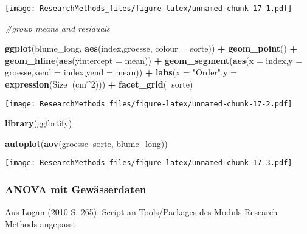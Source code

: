 \documentclass[]{book}
\newenvironment{Shaded}{\begin{snugshade}}{\end{snugshade}}
\newcommand{\KeywordTok}[1]{\textcolor[rgb]{0.13,0.29,0.53}{\textbf{#1}}}
\newcommand{\DataTypeTok}[1]{\textcolor[rgb]{0.13,0.29,0.53}{#1}}
\newcommand{\DecValTok}[1]{\textcolor[rgb]{0.00,0.00,0.81}{#1}}
\newcommand{\StringTok}[1]{\textcolor[rgb]{0.31,0.60,0.02}{#1}}
\newcommand{\CommentTok}[1]{\textcolor[rgb]{0.56,0.35,0.01}{\textit{#1}}}
\newcommand{\OperatorTok}[1]{\textcolor[rgb]{0.81,0.36,0.00}{\textbf{#1}}}
\newcommand{\NormalTok}[1]{#1}
\begin{document}
\texttt{[image: ResearchMethods\_files/figure-latex/unnamed-chunk-17-1.pdf]}

\begin{Shaded}
\begin{Highlighting}[]

\CommentTok{#group means and residuals}

\KeywordTok{ggplot}\NormalTok{(blume_long, }\KeywordTok{aes}\NormalTok{(index,groesse, }\DataTypeTok{colour =}\NormalTok{ sorte)) }\OperatorTok{+}
\StringTok{  }\KeywordTok{geom_point}\NormalTok{() }\OperatorTok{+}
\StringTok{  }\KeywordTok{geom_hline}\NormalTok{(}\KeywordTok{aes}\NormalTok{(}\DataTypeTok{yintercept =}\NormalTok{ mean)) }\OperatorTok{+}
\StringTok{  }\KeywordTok{geom_segment}\NormalTok{(}\KeywordTok{aes}\NormalTok{(}\DataTypeTok{x =}\NormalTok{ index,}\DataTypeTok{y =}\NormalTok{ groesse,}\DataTypeTok{xend =}\NormalTok{ index,}\DataTypeTok{yend =}\NormalTok{ mean)) }\OperatorTok{+}
\StringTok{  }\KeywordTok{labs}\NormalTok{(}\DataTypeTok{x =} \StringTok{"Order"}\NormalTok{,}\DataTypeTok{y =} \KeywordTok{expression}\NormalTok{(Size}\OperatorTok{~}\NormalTok{(cm}\OperatorTok{^}\DecValTok{2}\NormalTok{))) }\OperatorTok{+}
\StringTok{  }\KeywordTok{facet_grid}\NormalTok{(}\OperatorTok{~}\NormalTok{sorte)}
\end{Highlighting}
\end{Shaded}

\texttt{[image: ResearchMethods\_files/figure-latex/unnamed-chunk-17-2.pdf]}

\begin{Shaded}
\begin{Highlighting}[]



\KeywordTok{library}\NormalTok{(ggfortify)}

\KeywordTok{autoplot}\NormalTok{(}\KeywordTok{aov}\NormalTok{(groesse}\OperatorTok{~}\NormalTok{sorte, blume_long))}
\end{Highlighting}
\end{Shaded}

\texttt{[image: ResearchMethods\_files/figure-latex/unnamed-chunk-17-3.pdf]}

\subsubsection{ANOVA mit Gewässerdaten}\label{anova-mit-gewasserdaten}

Aus Logan (\protect\hyperlink{ref-logan2010}{2010} S. 265): Script an
Tools/Packages des Moduls Research Methods angepasst
\end{document}
